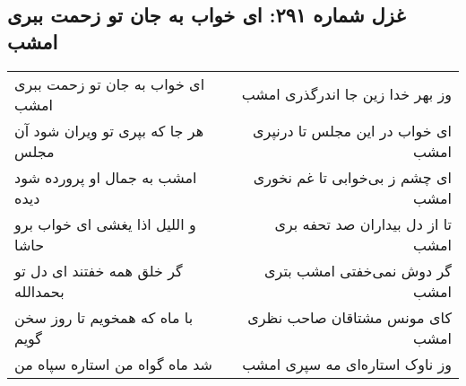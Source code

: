 \begin{center}
\section*{غزل شماره ۲۹۱: ای خواب به جان تو زحمت ببری امشب}
\label{sec:0291}
\begin{longtable}{l p{0.5cm} r}
ای خواب به جان تو زحمت ببری امشب
&&
وز بهر خدا زین جا اندرگذری امشب
\\
هر جا که بپری تو ویران شود آن مجلس
&&
ای خواب در این مجلس تا درنپری امشب
\\
امشب به جمال او پرورده شود دیده
&&
ای چشم ز بی‌خوابی تا غم نخوری امشب
\\
و اللیل اذا یغشی ای خواب برو حاشا
&&
تا از دل بیداران صد تحفه بری امشب
\\
گر خلق همه خفتند ای دل تو بحمدالله
&&
گر دوش نمی‌خفتی امشب بتری امشب
\\
با ماه که همخویم تا روز سخن گویم
&&
کای مونس مشتاقان صاحب نظری امشب
\\
شد ماه گواه من استاره سپاه من
&&
وز ناوک استاره‌ای مه سپری امشب
\\
\end{longtable}
\end{center}
